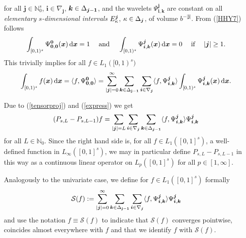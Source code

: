 \documentclass[12pt]{article}
\newcommand{\bsk}{\boldsymbol{k}}
\newcommand{\bsi}{\boldsymbol{i}}
\newcommand{\bsj}{\boldsymbol{j}}
\newcommand{\bsx}{\boldsymbol{x}}
\newcommand{\NN}{\mathbb{N}}
\newcommand{\N}{\mathbb{N}}
\begin{document}
for all $\bsj \in \N_0^s$, $\bsi \in \nabla_{\bsj}$, $\bsk \in \Delta_{\bsj - {\bf 1}}$, and the wavelets $\Psi^{\bsj}_{\bsi,\bsk}$
are constant on all \emph{elementary $s$-dimensional intervals} $E^{\bsj}_{{\bf \kappa}}$, ${\bf \kappa}\in \Delta_{\bsj}$,  of volume $b^{-|\bsj|}$.
From (\ref{HHY7}) follows 
\begin{equation}\label{eq:integral_wavelet}
\int_{[0,1)^s} \Psi^{{\bf 0}}_{{\bf 0}, {\bf 0}}(\bsx) \, {\rm d}\bsx = 1
\hspace{3ex}\text{and}\hspace{3ex}
\int_{[0,1)^s} \Psi^{\bsj}_{\bsi,\bsk}(\bsx) \, {\rm d}\bsx = 0
\hspace{3ex}\text{if}\hspace{3ex}
|\bsj|\ge 1.
\end{equation}
This trivially implies for all $f\in L_1([0,1)^s)$
\begin{equation}\label{eq:integral_f}
\int_{[0,1)^s} f(\bsx) \, {\rm d}\bsx = \langle f, \Psi^{{\bf 0}}_{{\bf 0}, {\bf 0}} \rangle = \sum^\infty_{|\bsj|=0} \sum_{\bsk\in \Delta_{{\bf j-1}}}
\sum_{\bsi\in \nabla_{\bsj}} \langle f, \Psi^{\bsj}_{\bsi,\bsk} \rangle
\int_{[0,1)^s} \Psi^{\bsj}_{\bsi,\bsk}(\bsx) \, {\rm d}\bsx.
\end{equation}

Due to (\ref{tensorproj}) and (\ref{express}) we get
\begin{equation}
\label{s-express}
(P_{s,L}-P_{s,L-1})f =
\sum_{|\bsj|=L} \sum_{\bsi\in\nabla_{\bsj}}
\sum_{\bsk\in\Delta_{\bsj-{\bf 1}}} \langle f, \Psi^{\bsj}_{\bsi,\bsk}
\rangle \Psi^{\bsj}_{\bsi,\bsk}
\end{equation}
for all $L\in\NN_0$.
Since the right hand side is, for all $f\in L_1([0,1]^s)$,
a well-defined function in $L_\infty([0,1]^s)$, we may in particular
define
$P_{s,L}-P_{s,L-1}$ in this way as a continuous linear operator
on $L_p([0,1]^s)$ for all $p\in [1,\infty]$.

Analogously to the univariate case, we define for $f\in L_1([0,1]^s)$ formally
\begin{equation}
\label{sf}
\mathcal{S}(f) := \sum^\infty_{|\bsj|=0} \sum_{\bsk\in \Delta_{{\bf j-1}}}
\sum_{\bsi\in \nabla_{\bsj}} \langle f, \Psi^{\bsj}_{\bsi,\bsk} \rangle
\Psi^{\bsj}_{\bsi,\bsk}
\end{equation} 
and use the notation $f\equiv \mathcal{S}(f)$ to indicate that $\mathcal{S}(f)$ converges pointwise, coincides almost everywhere with $f$ and that we identify $f$ with $\mathcal{S}(f)$.
\end{document}
